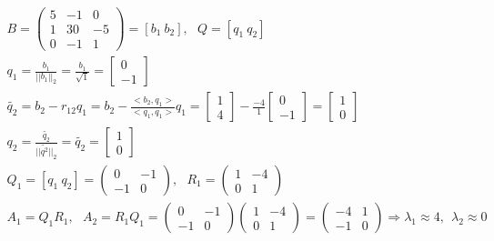 \documentclass[main.tex]{subfiles}
\begin{document}
    \begin{gather*}
        B = \begin{pmatrix}
                5 & -1 & 0\\
                1 & 30 & -5\\
                0 & -1 & 1
        \end{pmatrix}
        = [b_1 ~ b_2], ~~~ Q = [q_1 ~ q_2]\\
        q_1 = \frac{b_1}{||b_1||_2} = \frac{b_1}{\sqrt{1}} =
        \begin{bmatrix}
            0\\
            -1
        \end{bmatrix}\\
        \tilde{q_2} = b_2 - r_{12} q_1 = b_2 - \frac{<b_2, q_1>}{<q_1, q_1>} q_1 =
        \begin{bmatrix}
            1\\
            4
        \end{bmatrix}
        - \frac{-4}{1}
        \begin{bmatrix}
            0\\
            -1
        \end{bmatrix} =
        \begin{bmatrix}
            1\\
            0
        \end{bmatrix}\\
        q_2 = \frac{\tilde{q_2}}{||\tilde{q^2}||_2} = \tilde{q_2} =
        \begin{bmatrix}
            1\\
            0
        \end{bmatrix}\\
        Q_1 = [q_1 ~ q_2] =
        \begin{pmatrix}
            0 & -1\\
            -1 & 0
        \end{pmatrix}, ~~~
        R_1 =
        \begin{pmatrix}
            1 & -4\\
            0 & 1
        \end{pmatrix}\\
        A_1 = Q_1 R_1, ~~~ A_2 = R_1 Q_1 =
        \begin{pmatrix}
            0 & -1\\
            -1 & 0
        \end{pmatrix}
        \begin{pmatrix}
            1 & -4\\
            0 & 1
        \end{pmatrix}
        =
        \begin{pmatrix}
            -4 & 1\\
            -1 & 0
        \end{pmatrix}
        \Rightarrow
        \lambda_1 \approx 4, ~~ \lambda_2 \approx 0
    \end{gather*}
\end{document}
